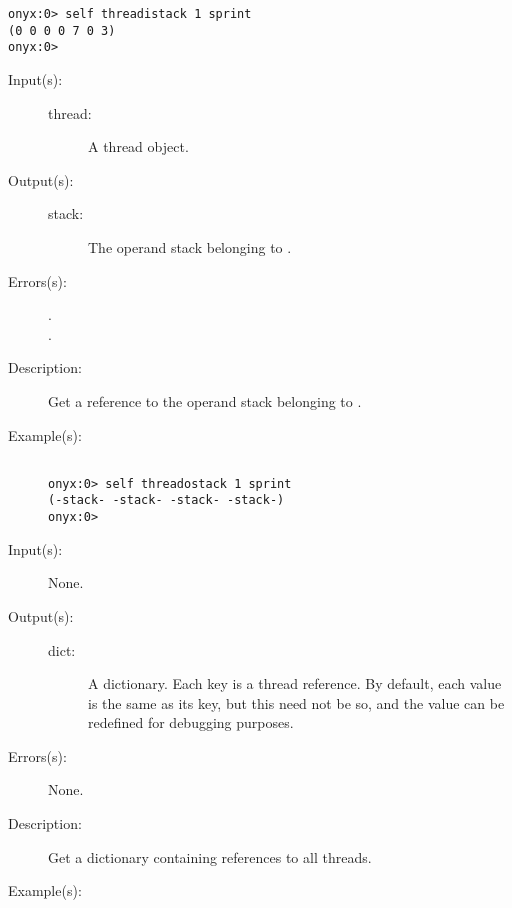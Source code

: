 \begin{description}
\begin{description}
\begin{verbatim}
onyx:0> self threadistack 1 sprint
(0 0 0 0 7 0 3)
onyx:0>
		\end{verbatim}
	\end{description}
\label{systemdict:threadostack}
\item[{\onyxop{thread}{threadostack}{stack}}: ]
	\begin{description}\item[]
	\item[Input(s): ]
		\begin{description}\item[]
		\item[thread: ]
			A thread object.
		\end{description}
	\item[Output(s): ]
		\begin{description}\item[]
		\item[stack: ]
			The operand stack belonging to .
		\end{description}
	\item[Errors(s): ]
		\begin{description}\item[]
		\item[.]
		\item[.]
		\end{description}
	\item[Description: ]
		Get a reference to the operand stack belonging to
		.
	\item[Example(s): ]\begin{verbatim}

onyx:0> self threadostack 1 sprint
(-stack- -stack- -stack- -stack-)
onyx:0>
		\end{verbatim}
	\end{description}
\label{systemdict:threadsdict}
\item[{\onyxop{--}{threadsdict}{dict}}: ]
	\begin{description}\item[]
	\item[Input(s): ] None.
	\item[Output(s): ]
		\begin{description}\item[]
		\item[dict: ]
			A dictionary.  Each key is a thread reference.  By
			default, each value is the same as its key, but this
			need not be so, and the value can be redefined for
			debugging purposes.
		\end{description}
	\item[Errors(s): ] None.
	\item[Description: ]
		Get a dictionary containing references to all threads.
	\item[Example(s): ]\begin{verbatim}


\end{verbatim}
\end{description}
\end{description}
